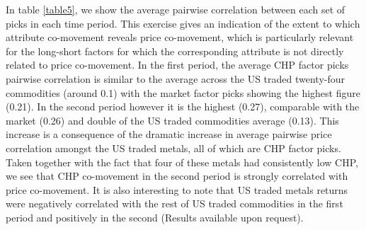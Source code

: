 \documentclass[12pt,]{article}
\begin{document}
In table \ref{table5}, we show the average pairwise correlation between
each set of picks in each time period. This exercise gives an indication
of the extent to which attribute co-movement reveals price co-movement,
which is particularly relevant for the long-short factors for which the
corresponding attribute is not directly related to price co-movement. In
the first period, the average CHP factor picks pairwise correlation is
similar to the average across the US traded twenty-four commodities
(around 0.1) with the market factor picks showing the highest figure
(0.21). In the second period however it is the highest (0.27),
comparable with the market (0.26) and double of the US traded
commodities average (0.13). This increase is a consequence of the
dramatic increase in average pairwise price correlation amongst the US
traded metals, all of which are CHP factor picks. Taken together with
the fact that four of these metals had consistently low CHP, we see that
CHP co-movement in the second period is strongly correlated with price
co-movement. It is also interesting to note that US traded metals
returns were negatively correlated with the rest of US traded
commodities in the first period and positively in the second (Results
available upon request).
\end{document}
